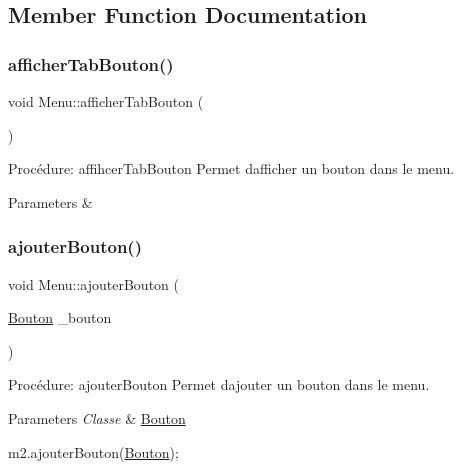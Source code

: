 \subsection{Member Function Documentation}
\mbox{\label{classMenu_af01f5f26519658b6e0fd92fdb8eda6fe}} 
\subsubsection{\texorpdfstring{afficher\+Tab\+Bouton()}{afficherTabBouton()}}
{\footnotesize\ttfamily void Menu\+::afficher\+Tab\+Bouton (\begin{DoxyParamCaption}{ }\end{DoxyParamCaption})}



Procédure\+: affihcer\+Tab\+Bouton Permet d\textquotesingle{}afficher\textquotesingle{} un bouton dans le menu. 


\begin{DoxyParams}{Parameters}
{\em } & \\
\hline
\end{DoxyParams}
\mbox{\label{classMenu_a429b2c8fcaed081553ce284ffa0637ab}} 
\subsubsection{\texorpdfstring{ajouter\+Bouton()}{ajouterBouton()}}
{\footnotesize\ttfamily void Menu\+::ajouter\+Bouton (\begin{DoxyParamCaption}\item[{\hyperlink{classBouton}{Bouton}}]{\+\_\+bouton }\end{DoxyParamCaption})}



Procédure\+: ajouter\+Bouton Permet d\textquotesingle{}ajouter un bouton dans le menu. 


\begin{DoxyParams}{Parameters}
{\em Classe} & \hyperlink{classBouton}{Bouton} 
\begin{DoxyCode}
m2.ajouterBouton(\hyperlink{classBouton}{Bouton});
\end{DoxyCode}
 \\
\hline
\end{DoxyParams}
\mbox{\label{classMenu_a16bc4dffec20a0ce177f189f9c711e09}} 
